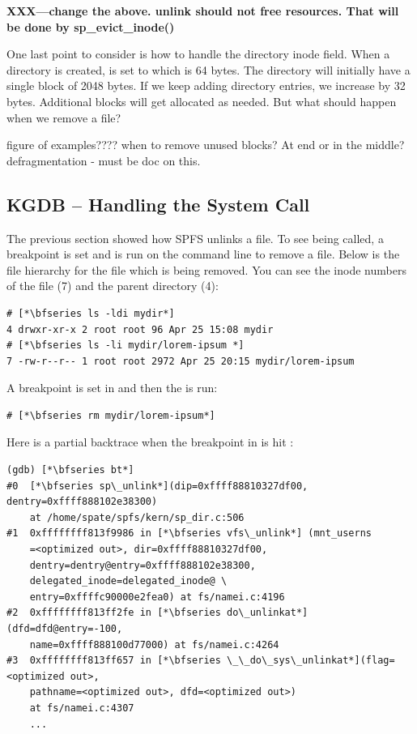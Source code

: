\textbf{XXX---change the above. unlink should not free resources. That will be done by sp\_evict\_inode()}

\noindent
One last point to consider is how to handle the directory inode  field. When a directory is created,  is set to  which is 64 bytes. The directory will initially have a single block of 2048 bytes. If we keep adding directory entries, we increase  by 32 bytes. Additional blocks will get allocated as needed. But what should happen when we remove a file?

figure of examples???? when to remove unused blocks? At end or in the middle? defragmentation - must be doc on this.


\subsection{KGDB -- Handling the  System Call}

The previous section showed how SPFS unlinks a file. To see  being called, a breakpoint is set and  is run on the command line to remove a file. Below is the file hierarchy for the file  which is being removed. You can see the inode numbers of the file (7) and the parent directory (4):

\begin{lstlisting}
# [*\bfseries ls -ldi mydir*]
4 drwxr-xr-x 2 root root 96 Apr 25 15:08 mydir
# [*\bfseries ls -li mydir/lorem-ipsum *]
7 -rw-r--r-- 1 root root 2972 Apr 25 20:15 mydir/lorem-ipsum
\end{lstlisting}

\noindent
A breakpoint is set in  and then the  is run:

\begin{lstlisting}
# [*\bfseries rm mydir/lorem-ipsum*]
\end{lstlisting}

\noindent
Here is a partial backtrace when the breakpoint in  is hit :

\begin{lstlisting}
(gdb) [*\bfseries bt*]
#0  [*\bfseries sp\_unlink*](dip=0xffff88810327df00, dentry=0xffff888102e38300)
    at /home/spate/spfs/kern/sp_dir.c:506
#1  0xffffffff813f9986 in [*\bfseries vfs\_unlink*] (mnt_userns
    =<optimized out>, dir=0xffff88810327df00, 
    dentry=dentry@entry=0xffff888102e38300, 
    delegated_inode=delegated_inode@ \
    entry=0xffffc90000e2fea0) at fs/namei.c:4196
#2  0xffffffff813ff2fe in [*\bfseries do\_unlinkat*] (dfd=dfd@entry=-100, 
    name=0xffff888100d77000) at fs/namei.c:4264
#3  0xffffffff813ff657 in [*\bfseries \_\_do\_sys\_unlinkat*](flag=<optimized out>, 
    pathname=<optimized out>, dfd=<optimized out>) 
    at fs/namei.c:4307
    ...
\end{lstlisting}

